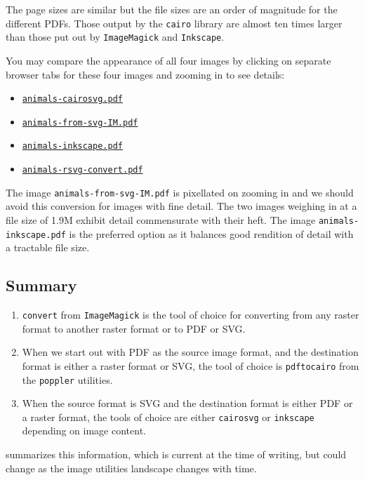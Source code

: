 \documentclass[
  11pt,
  british,
  a4paper,
]{article}
\providecommand{\tightlist}{%
  \setlength{\itemsep}{0pt}\setlength{\parskip}{0pt}}
\begin{document}
The page sizes are similar but the file sizes are an order of magnitude
for the different PDFs. Those output by the \texttt{cairo} library are
almost ten times larger than those put out by \texttt{ImageMagick} and
\texttt{Inkscape}.

You may compare the appearance of all four images by clicking on
separate browser tabs for these four images and zooming in to see
details:

\begin{itemize}
\tightlist
\item
  \href{images/animals-cairosvg.pdf}{\texttt{animals-cairosvg.pdf}}
\item
  \href{images/animals-from-svg-IM.pdf}{\texttt{animals-from-svg-IM.pdf}}
\item
  \href{images/animals-inkscape.pdf}{\texttt{animals-inkscape.pdf}}
\item
  \href{images/animals-rsvg-convert.pdf}{\texttt{animals-rsvg-convert.pdf}}
\end{itemize}

The image \texttt{animals-from-svg-IM.pdf} is pixellated on zooming in
and we should avoid this conversion for images with fine detail. The two
images weighing in at a file size of 1.9M exhibit detail commensurate
with their heft. The image \texttt{animals-inkscape.pdf} is the
preferred option as it balances good rendition of detail with a
tractable file size.

\hypertarget{summary}{%
\subsection{Summary}\label{summary}}

\begin{enumerate}
\item
  \texttt{convert} from \texttt{ImageMagick} is the tool of choice for
  converting from any raster format to another raster format or to PDF
  or SVG.
\item
  When we start out with PDF as the source image format, and the
  destination format is either a raster format or SVG, the tool of
  choice is \texttt{pdftocairo} from the \texttt{poppler} utilities.
\item
  When the source format is SVG and the destination format is either PDF
  or a raster format, the tools of choice are either \texttt{cairosvg}
  or \texttt{inkscape} depending on image content.
\end{enumerate}

 summarizes this information, which is current at the
time of writing, but could change as the image utilities landscape
changes with time.
\end{document}
